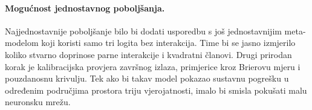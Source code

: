 \documentclass{article}
\begin{document}
\paragraph{Mogućnost jednostavnog poboljšanja.}
Najjednostavnije poboljšanje bilo bi dodati usporedbu s još jednostavnijim meta-modelom koji koristi samo tri logita bez interakcija. Time bi se jasno izmjerilo koliko stvarno doprinose parne interakcije i kvadratni članovi. Drugi prirodan korak je kalibracijska provjera završnog izlaza, primjerice kroz Brierovu mjeru i pouzdanosnu krivulju. Tek ako bi takav model pokazao sustavnu pogrešku u određenim područjima prostora triju vjerojatnosti, imalo bi smisla pokušati malu neuronsku mrežu.
\end{document}
